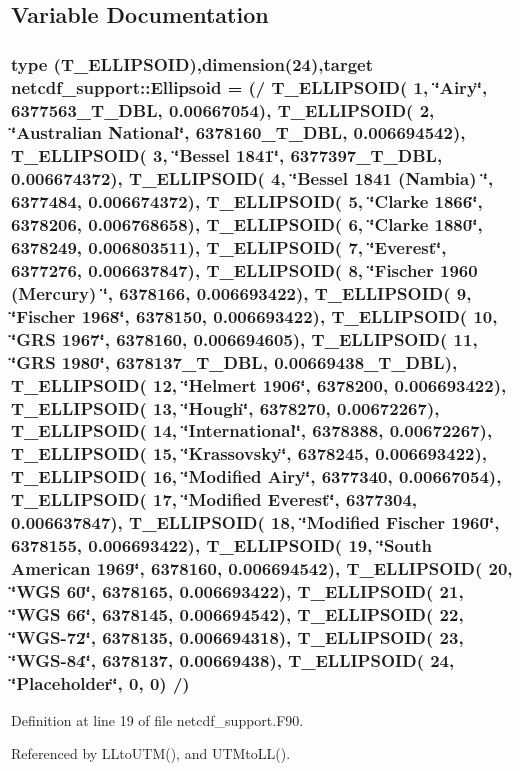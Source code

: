 \subsection{Variable Documentation}
\hypertarget{namespacenetcdf__support_ad7768781e3e21a9e3d534c4f2c551a8f}{
\subsubsection[{Ellipsoid}]{\setlength{\rightskip}{0pt plus 5cm}type ({\bf T\_\-ELLIPSOID}),dimension(24),target {\bf netcdf\_\-support::Ellipsoid} = (/ {\bf T\_\-ELLIPSOID}( 1, \char`\"{}Airy\char`\"{}, 6377563\_\-T\_\-DBL, 0.00667054), T\_\-ELLIPSOID( 2, \char`\"{}Australian National\char`\"{}, 6378160\_\-T\_\-DBL, 0.006694542), T\_\-ELLIPSOID( 3, \char`\"{}Bessel 1841\char`\"{}, 6377397\_\-T\_\-DBL, 0.006674372), T\_\-ELLIPSOID( 4, \char`\"{}Bessel 1841 (Nambia) \char`\"{}, 6377484, 0.006674372), T\_\-ELLIPSOID( 5, \char`\"{}Clarke 1866\char`\"{}, 6378206, 0.006768658), T\_\-ELLIPSOID( 6, \char`\"{}Clarke 1880\char`\"{}, 6378249, 0.006803511), T\_\-ELLIPSOID( 7, \char`\"{}Everest\char`\"{}, 6377276, 0.006637847), T\_\-ELLIPSOID( 8, \char`\"{}Fischer 1960 (Mercury) \char`\"{}, 6378166, 0.006693422), T\_\-ELLIPSOID( 9, \char`\"{}Fischer 1968\char`\"{}, 6378150, 0.006693422), T\_\-ELLIPSOID( 10, \char`\"{}GRS 1967\char`\"{}, 6378160, 0.006694605), T\_\-ELLIPSOID( 11, \char`\"{}GRS 1980\char`\"{}, 6378137\_\-T\_\-DBL, 0.00669438\_\-T\_\-DBL), T\_\-ELLIPSOID( 12, \char`\"{}Helmert 1906\char`\"{}, 6378200, 0.006693422), T\_\-ELLIPSOID( 13, \char`\"{}Hough\char`\"{}, 6378270, 0.00672267), T\_\-ELLIPSOID( 14, \char`\"{}International\char`\"{}, 6378388, 0.00672267), T\_\-ELLIPSOID( 15, \char`\"{}Krassovsky\char`\"{}, 6378245, 0.006693422), T\_\-ELLIPSOID( 16, \char`\"{}Modified Airy\char`\"{}, 6377340, 0.00667054), T\_\-ELLIPSOID( 17, \char`\"{}Modified Everest\char`\"{}, 6377304, 0.006637847), T\_\-ELLIPSOID( 18, \char`\"{}Modified Fischer 1960\char`\"{}, 6378155, 0.006693422), T\_\-ELLIPSOID( 19, \char`\"{}South American 1969\char`\"{}, 6378160, 0.006694542), T\_\-ELLIPSOID( 20, \char`\"{}WGS 60\char`\"{}, 6378165, 0.006693422), T\_\-ELLIPSOID( 21, \char`\"{}WGS 66\char`\"{}, 6378145, 0.006694542), T\_\-ELLIPSOID( 22, \char`\"{}WGS-\/72\char`\"{}, 6378135, 0.006694318), T\_\-ELLIPSOID( 23, \char`\"{}WGS-\/84\char`\"{}, 6378137, 0.00669438), T\_\-ELLIPSOID( 24, \char`\"{}Placeholder\char`\"{}, 0, 0) /)}}
\label{namespacenetcdf__support_ad7768781e3e21a9e3d534c4f2c551a8f}


Definition at line 19 of file netcdf\_\-support.F90.



Referenced by LLtoUTM(), and UTMtoLL().

